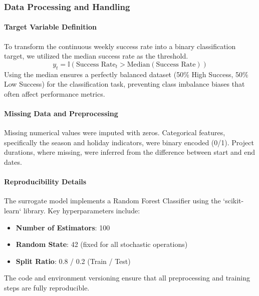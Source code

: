 \subsubsection{Data Processing and Handling}
\paragraph{Target Variable Definition}
To transform the continuous weekly success rate into a binary classification target, we utilized the median success rate as the threshold.
\begin{equation}
    y_t = \mathbb{I}(\text{Success Rate}_t > \text{Median}(\text{Success Rate}))
\end{equation}
Using the median ensures a perfectly balanced dataset (50\% High Success, 50\% Low Success) for the classification task, preventing class imbalance biases that often affect performance metrics.

\paragraph{Missing Data and Preprocessing}
Missing numerical values were imputed with zeros. Categorical features, specifically the season and holiday indicators, were binary encoded (0/1). Project durations, where missing, were inferred from the difference between start and end dates.

\paragraph{Reproducibility Details}
The surrogate model implements a Random Forest Classifier using the `scikit-learn` library. Key hyperparameters include:
\begin{itemize}
    \item \textbf{Number of Estimators}: 100
    \item \textbf{Random State}: 42 (fixed for all stochastic operations)
    \item \textbf{Split Ratio}: 0.8 / 0.2 (Train / Test)
\end{itemize}
The code and environment versioning ensure that all preprocessing and training steps are fully reproducible.
